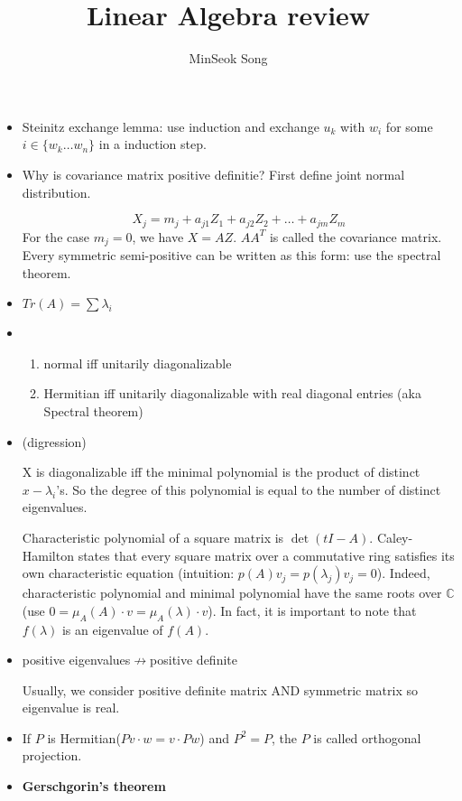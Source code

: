 \documentclass{article}
\title{Linear Algebra review}
\author{MinSeok Song}
\date{}
\theoremstyle{remark}
\begin{document}
\maketitle
\begin{itemize}
\textbf{Rank Nullity Theorem}

Let $T:V\to W$ be a linear transformation between two vector spaces. Then $Rank (T)+Nullity(T)=dim(V)$.
(this can be easily shown by using first isomorphism theorem and splitting lemma(check))
\begin{proof}
Another method is to compare $Nullity(T)$ and $dim(V)$, and apply Steinitz exchange lemma to find the dimension of the image.
\end{proof}
\item Steinitz exchange lemma: use induction and exchange $u_k$ with $w_i$ for some $i\in\{w_k\dots w_n\}$ in a induction step.
\item Why is covariance matrix positive definitie?
First define joint normal distribution. 

$$X_j=m_j+a_{j1}Z_1+a_{j2}Z_2+\dots+a_{jm}Z_m$$
For the case $m_j=0$, we have $X=AZ$. $AA^T$ is called the covariance matrix. Every symmetric semi-positive can be written as this form: use the spectral theorem.

\item $Tr(A)=\sum \lambda_i$
\item 
\begin{enumerate}
\item normal iff unitarily diagonalizable
\item Hermitian iff unitarily diagonalizable with real diagonal entries (aka Spectral theorem)
\end{enumerate}
\item (digression) 

X is diagonalizable iff the minimal polynomial is the product of distinct $x-\lambda_i$'s. So the degree of this polynomial is equal to the number of distinct eigenvalues.

Characteristic polynomial of a square matrix is $\det(tI-A)$. Caley-Hamilton states that every square matrix over a commutative ring satisfies its own characteristic equation (intuition: $p(A)v_j=p(\lambda_j)v_j=0$). Indeed, characteristic polynomial and minimal polynomial have the same roots over $\mathbb{C}$ (use $0=\mu_A (A)\cdot v=\mu_A (\lambda)\cdot v$). In fact, it is important to note that $f(\lambda)$ is an eigenvalue of $f(A)$.

\item positive eigenvalues$\not\to$positive definite

Usually, we consider positive definite matrix AND symmetric matrix so eigenvalue is real.
\item If $P$ is Hermitian($Pv\cdot w=v\cdot Pw$) and $P^2=P$, the $P$ is called orthogonal projection.
\item \textbf{Gerschgorin's theorem}
\end{itemize}
\end{document}
